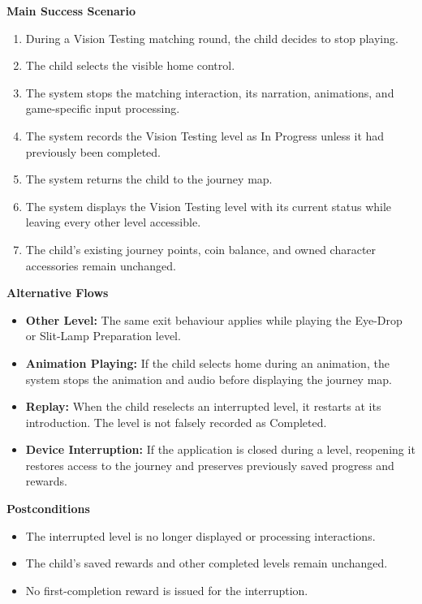 \documentclass[10pt]{article}
\begin{document}
\textbf{Main Success Scenario}
\begin{enumerate}
    \item During a Vision Testing matching round, the child decides
    to stop playing.
    \item The child selects the visible home control.
    \item The system stops the matching interaction, its narration,
    animations, and game-specific input processing.
    \item The system records the Vision Testing level as In Progress
    unless it had previously been completed.
    \item The system returns the child to the journey map.
    \item The system displays the Vision Testing level with its
    current status while leaving every other level accessible.
    \item The child's existing journey points, coin balance, and
    owned character accessories remain unchanged.
\end{enumerate}

\textbf{Alternative Flows}
\begin{itemize}
    \item \textbf{Other Level:} The same exit behaviour applies while
    playing the Eye-Drop or Slit-Lamp Preparation level.
    \item \textbf{Animation Playing:} If the child selects home during
    an animation, the system stops the animation and audio before
    displaying the journey map.
    \item \textbf{Replay:} When the child reselects an interrupted
    level, it restarts at its introduction. The level is not
    falsely recorded as Completed.
    \item \textbf{Device Interruption:} If the application is closed
    during a level, reopening it restores access to the journey
    and preserves previously saved progress and rewards.
\end{itemize}

\textbf{Postconditions}
\begin{itemize}
    \item The interrupted level is no longer displayed or processing
    interactions.
    \item The child's saved rewards and other completed levels
    remain unchanged.
    \item No first-completion reward is issued for the interruption.
\end{itemize}
\end{document}
